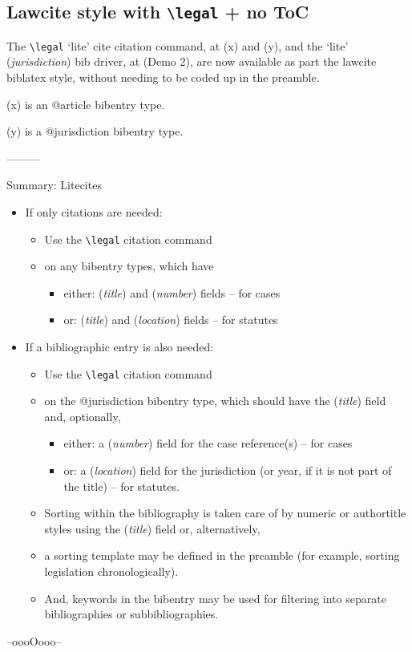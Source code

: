 \documentclass[12pt]{article}
\newcommand\goodoh{{\large\ftmark 🗸}}
\newcommand\bef[1]{(\textit{#1})}
\newcommand\cmd[1]{\texttt{\textbackslash #1}}
\begin{document}



\subsection{Lawcite style with \cmd{legal} + no ToC}
The \cmd{legal} `lite' cite citation command, at (x) and (y), and the 
`lite' \bef{jurisdiction} bib driver, at (Demo 2), are now available as part the lawcite biblatex style, without needing to be coded up in the preamble.
\bigskip

\noindent (x) is an @article bibentry type.

\noindent (y) is a @jurisdiction bibentry type.
\bigskip
\bigskip

\hfill ---------\hfill\ 

\bigskip

Summary: Litecites

\begin{itemize}
\item If only citations are needed:
	\begin{itemize}
	\item Use the \cmd{legal} citation command
	\item on any bibentry types, which have
		\begin{itemize}
		\item either: \bef{title} and \bef{number} fields -- for cases
		\item or: \bef{title} and \bef{location} fields -- for statutes
		\end{itemize}
	\end{itemize}
\item If a bibliographic entry is also needed:
	\begin{itemize}
	\item Use the \cmd{legal} citation command
	\item on the @jurisdiction bibentry type, which should have the \bef{title} field and, optionally,
		\begin{itemize}
		\item either:  a \bef{number} field for the case reference(s) -- for cases
		\item or: a \bef{location} field for the jurisdiction (or year, if it is not part of the title) -- for statutes.
		\end{itemize}
		\item Sorting within the bibliography is taken care of by numeric or authortitle styles using the \bef{title} field or, alternatively,
		\item a sorting template may be defined in the preamble (for example, sorting legislation chronologically).
		\item And, keywords in the bibentry may be used for filtering into separate bibliographies or subbibliographies.
	\end{itemize}
\end{itemize}



\bigskip
\bigskip
\hfill --oooOooo--\hfill\ 
\end{document}
